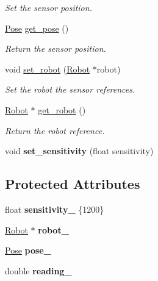 \begin{DoxyCompactItemize}
\begin{DoxyCompactList}\small\item\em Set the sensor position. \end{DoxyCompactList}\item 
\mbox{\label{class_sensor_afa533b8d8bb5f3787682ffc5ab8c989c}} 
\mbox{\hyperlink{struct_pose}{Pose}} \mbox{\hyperlink{class_sensor_afa533b8d8bb5f3787682ffc5ab8c989c}{get\+\_\+pose}} ()
\begin{DoxyCompactList}\small\item\em Return the sensor position. \end{DoxyCompactList}\item 
\mbox{\label{class_sensor_acb2c03838972a6bd717cd61866ab4a80}} 
void \mbox{\hyperlink{class_sensor_acb2c03838972a6bd717cd61866ab4a80}{set\+\_\+robot}} (\mbox{\hyperlink{class_robot}{Robot}} $\ast$robot)
\begin{DoxyCompactList}\small\item\em Set the robot the sensor references. \end{DoxyCompactList}\item 
\mbox{\label{class_sensor_ab2e0b1dd3ec3f9582c6643a77e2e29fd}} 
\mbox{\hyperlink{class_robot}{Robot}} $\ast$ \mbox{\hyperlink{class_sensor_ab2e0b1dd3ec3f9582c6643a77e2e29fd}{get\+\_\+robot}} ()
\begin{DoxyCompactList}\small\item\em Return the robot reference. \end{DoxyCompactList}\item 
\mbox{\label{class_sensor_a75ccd0eec457119294947a13282516c8}} 
void {\bfseries set\+\_\+sensitivity} (float sensitivity)
\end{DoxyCompactItemize}
\subsection*{Protected Attributes}
\begin{DoxyCompactItemize}
\item 
\mbox{\label{class_sensor_a60d8923d0fab719c4693bab0798bdd1c}} 
float {\bfseries sensitivity\+\_\+} \{1200\}
\item 
\mbox{\label{class_sensor_aa730542e905a7e0256eb987a06349078}} 
\mbox{\hyperlink{class_robot}{Robot}} $\ast$ {\bfseries robot\+\_\+}
\item 
\mbox{\label{class_sensor_ad060f21909f3e4f5dfd310cb2fa52000}} 
\mbox{\hyperlink{struct_pose}{Pose}} {\bfseries pose\+\_\+}
\item 
\mbox{\label{class_sensor_ad71b1c465eae9ddf1da31cff1cbe3736}} 
double {\bfseries reading\+\_\+}
\end{DoxyCompactItemize}


